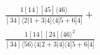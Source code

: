 \documentclass[varwidth, border=5pt]{standalone}
\begin{document}
\begin{my}
$\begin{gathered}
\scriptscriptstyle\frac{1[14][45]⟨46⟩}{[34]⟨2|1+3|4]⟨4|5+6|4]}+\\
\scriptscriptstyle\frac{1[14][24]⟨46⟩^2}{[34]⟨56⟩⟨4|2+3|4]⟨4|5+6|4]}\phantom{+}
\end{gathered}$
\end{my}
\end{document}

